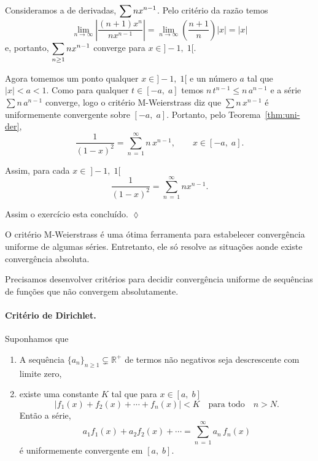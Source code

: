 Consideramos a \ser de derivadas, $\displaystyle{\sum nx^{n-1}}$. Pelo
critério da razão temos
\begin{equation*}
    \lim_{n\to\infty}\left|\frac{(n+1)x^n}{nx^{n-1}} \right|=\lim_{n\to\infty}\left(\frac{n+1}{n}
    \right)|x|=|x|
\end{equation*}
e, portanto, $\displaystyle{\sum_{n\ge 1} nx^{n-1}}$ converge para $x\in
]-1, \; 1[$.

Agora tomemos um ponto qualquer $x\in ]-1,\; 1[$ e un número $a$ tal
que $|x|<a<1$. Como para qualquer $t\in [-a, \; a]$ temos $n\,t^{n-1}\le
n\,a^{n-1}$ e a série $\sum n\, a^{n-1}$ converge, logo o critério M-Weierstrass
diz que $\sum n\,x^{n-1}$ é uniformemente convergente sobre $[-a,\; a]$.
Portanto, pelo Teorema~\ref{thm:uni-der},
\begin{equation*}
    \frac{1}{(1-x)^2}=\sum_{n\,=\, 1}^{\infty}n\,x^{n-1},\qquad x\in [-a,\; a].
\end{equation*}

Assim, para cada $x\in\; ]-1,\; 1[$
\begin{equation*}
    \frac{1}{(1-x)^2}=\sum_{n\,=\, 1}^{\infty}nx^{n-1}.
\end{equation*}

Assim o exercício esta concluído. \hfill \(\lozenge\)

O critério M-Weierstrass é uma ótima ferramenta para estabelecer
convergência uniforme de algumas séries. Entretanto, ele só
resolve as situações aonde existe convergência absoluta.

Precisamos desenvolver critérios para decidir convergência
uniforme de sequências de funções que não convergem absolutamente.

\paragraph{Critério de Dirichlet.} Suponhamos que
\begin{enumerate}[label=(\alph*),leftmargin=1.5cm]
    \item A sequência $\{a_n\}_{n\ge 1} \subsetneq \mathbb{R}^{+}$ de termos não negativos seja
    descrescente com limite zero,
    \item  existe uma constante $K$ tal que para $x\in [a,\; b]$
    \begin{equation*}
    |f_1(x)+f_2(x)+\cdots+f_n(x)|<K \quad \textrm{para todo}\quad n>N.
\end{equation*}
Então a série,
\begin{equation*}
    a_1f_1(x)+a_2f_2(x)+\cdots =\sum_{n\,=\, 1}^{\infty}a_n\,f_n(x)
\end{equation*}
é uniformemente convergente em $[a,\;  b]$.
\end{enumerate}


